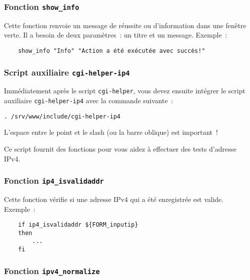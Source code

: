 \subsubsection{Fonction \texttt{show\_info}}

Cette fonction renvoie un message de réussite ou d'information dans une fenêtre verte.
Il a besoin de deux paramètres~: un titre et un message. Exemple~:

\begin{example}
\begin{verbatim}
    show_info "Info" "Action a été exécutée avec succès!"
\end{verbatim}
\end{example}


\subsubsection{Script auxiliaire \texttt{cgi-helper-ip4}}

Immédiatement après le script \texttt{cgi-helper}, vous devez ensuite intégrer
le script auxiliaire \texttt{cgi-helper-ip4} avec la commande suivante~:

\begin{example}
\begin{verbatim}
. /srv/www/include/cgi-helper-ip4
\end{verbatim}
\end{example}

L'espace entre le point et le slash (ou la barre oblique) est important~!

Ce script fournit des fonctions pour vous aidez à effectuer des tests d'adresse IPv4.


\subsubsection{Fonction \texttt{ip4\_isvalidaddr}}

Cette fonction vérifie si une adresse IPv4 qui a été enregistrée est valide.
Exemple~:

\begin{example}
\begin{verbatim}
    if ip4_isvalidaddr ${FORM_inputip}
    then
        ...
    fi
\end{verbatim}
\end{example}


\subsubsection{Fonction \texttt{ipv4\_normalize}}

